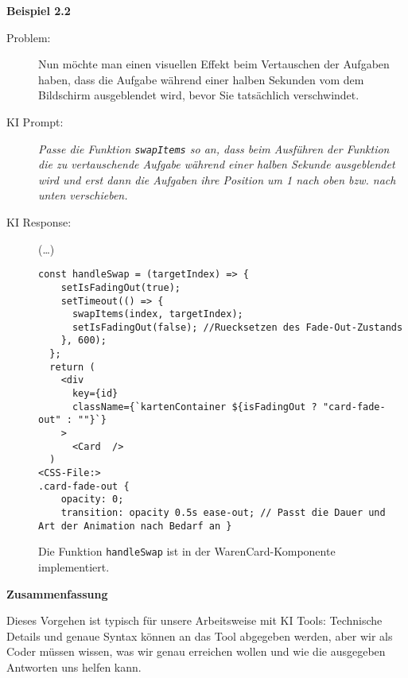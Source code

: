 \textbf{Beispiel 2.2} 
\begin{description}
    \item[Problem:] 
Nun möchte man einen visuellen Effekt beim Vertauschen der Aufgaben haben, dass die Aufgabe während einer halben Sekunden vom dem Bildschirm ausgeblendet wird, bevor Sie tatsächlich verschwindet. 
\item[KI Prompt:] \emph{Passe die Funktion \texttt{swapItems} so an, dass beim Ausführen der Funktion die zu vertauschende Aufgabe während einer halben Sekunde ausgeblendet wird und erst dann die Aufgaben ihre Position um 1 nach oben bzw. nach unten verschieben. }

\item[KI Response:] (\ldots)
\begin{lstlisting}
const handleSwap = (targetIndex) => {
    setIsFadingOut(true);
    setTimeout(() => {
      swapItems(index, targetIndex);
      setIsFadingOut(false); //Ruecksetzen des Fade-Out-Zustands
    }, 600);
  };
  return (
    <div
      key={id}
      className={`kartenContainer ${isFadingOut ? "card-fade-out" : ""}`}
    >
      <Card  />
  )
<CSS-File:>
.card-fade-out {
    opacity: 0;
    transition: opacity 0.5s ease-out; // Passt die Dauer und Art der Animation nach Bedarf an }

\end{lstlisting}

Die Funktion \texttt{handleSwap} ist in der WarenCard-Komponente implementiert.
\end{description}

\textbf{Zusammenfassung}

Dieses Vorgehen ist typisch für unsere Arbeitsweise mit KI Tools: Technische Details und genaue Syntax können an das Tool abgegeben werden, aber wir als Coder müssen wissen, was wir genau erreichen wollen und wie die ausgegeben Antworten uns helfen kann. 